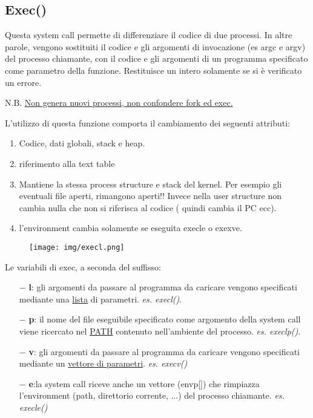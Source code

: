 \documentclass{article}
\begin{document}
\subsection{Exec()}

\noindent{}
\medskip

\noindent Questa system call permette di differenziare il 
codice di due processi. In altre parole, vengono sostituiti
il codice e gli argomenti di invocazione (es argc e argv)
del processo chiamante, con il codice e gli argomenti di un 
programma specificato come parametro della funzione.
Restituisce un intero solamente se si è verificato un errore.

N.B. \underline{Non genera nuovi processi, non confondere fork ed exec.}


L'utilizzo di questa funzione comporta il cambiamento dei 
seguenti attributi:
\begin{enumerate}
    \item Codice, dati globali, stack e heap.
    \item riferimento alla text table
    \item Mantiene la stessa process structure e stack del kernel.
    Per esempio gli eventuali file aperti, rimangono aperti!! 
    Invece nella user structure non cambia nulla che non si
    riferisca al codice ( quindi cambia il PC ecc).
    \item l'environment cambia solamente se eseguita execle o exexve.
\end{enumerate}

\begin{figure}[h!]
    \begin{center}
        \texttt{[image: img/execl.png]}
    \end{center}
\end{figure}

\noindent Le variabili di exec, a seconda del suffisso:
\begin{itemize}
    \item[$-$]\textbf{l}: gli argomenti da passare al 
    programma da caricare vengono specificati mediante una 
    \underline{lista} di parametri. \textit{es. execl()}.
    \item[$-$]\textbf{p}: il nome del file eseguibile 
    specificato come argomento della system call viene 
    ricercato nel \underline{PATH} contenuto nell'ambiente 
    del processo. \textit{es. execlp()}.
    \item[$-$]\textbf{v}: gli argomenti da passare al
    programma da caricare vengono specificati mediante 
    un \underline{vettore di parametri}. \textit{es. execv()}
    \item[$-$]\textbf{e}:la system call riceve anche un
    vettore (envp[]) che rimpiazza l'environment (path, 
    direttorio corrente, ...) del processo chiamante. \textit{es.
    execle()}
\end{itemize}
\end{document}
